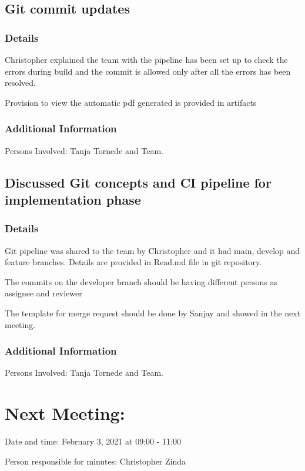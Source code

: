 \documentclass[11pt]{meetingmins} %
\begin{document}
\subsection{Git commit updates}
\subsubsection{Details}
\begin{hiddensubitems}
    \item
    Christopher explained the team with the pipeline has been set up to check the errors during build and the commit is allowed only after all the errors has been resolved.
    \item
    Provision to view the automatic pdf generated is provided in artifacts
\end{hiddensubitems}

\subsubsection{Additional Information}
\begin{hiddensubitems}
    \item
    Persons Involved: Tanja Tornede and Team.
\end{hiddensubitems}

\subsection{Discussed Git concepts and CI pipeline for implementation phase}
\subsubsection{Details}
\begin{hiddensubitems}
    \item
    Git pipeline was shared to the team by Christopher and it had main, develop and feature branches. Details are provided in Read.md file in git repository. 
    \item
    The  commits on the developer branch should be having different persons as assignee and reviewer 
    \item 
    The template for merge request should be done by Sanjay and showed in the next meeting.
\end{hiddensubitems}

\subsubsection{Additional Information}
\begin{hiddensubitems}
    \item
    Persons Involved: Tanja Tornede and Team.
\end{hiddensubitems}

\section{Next Meeting:}
\begin{hiddensubitems}
    \item
    Date and time: February 3, 2021 at 09:00 - 11:00
    \item
    Person responsible for minutes: Christopher Zinda
\end{hiddensubitems}
\end{document}
